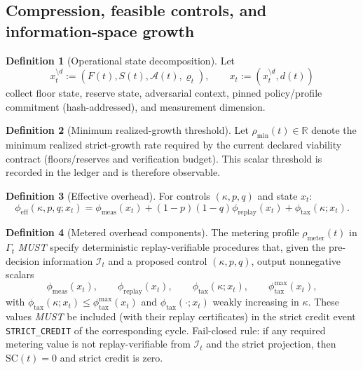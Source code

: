 \documentclass[11pt,a4paper]{article}
\newcommand{\R}{\mathbb{R}}
\newcommand{\cA}{\mathcal{A}}
\newcommand{\cI}{\mathcal{I}}
\theoremstyle{definition}
\newtheorem{definition}{Definition}
\theoremstyle{remark}
\begin{document}
\subsection{Compression, feasible controls, and information-space growth}
\begin{definition}[Operational state decomposition]\label{def:operational_state_decomposition}
Let
\[
x_t^{\setminus d}:=(F(t),S(t),\cA(t),\varrho_t),\qquad
x_t:=(x_t^{\setminus d},d(t))
\]
collect floor state, reserve state, adversarial context, pinned policy/profile commitment (hash-addressed), and measurement dimension.
\end{definition}

\begin{definition}[Minimum realized-growth threshold]\label{def:minimum_realized_growth_threshold}
Let $\rho_{\min}(t)\in\R$ denote the minimum realized strict-growth rate required by the current declared viability contract (floors/reserves and verification budget). This scalar threshold is recorded in the ledger and is therefore observable.
\end{definition}


\begin{definition}[Effective overhead]\label{def:effective_overhead}
For controls $(\kappa,p,q)$ and state $x_t$:
\[
\phi_{\mathrm{eff}}(\kappa,p,q;x_t)=\phi_{\mathrm{meas}}(x_t)+(1-p)(1-q)\phi_{\mathrm{replay}}(x_t)+\phi_{\mathrm{tax}}(\kappa;x_t).
\]
\end{definition}

\begin{definition}[Metered overhead components]\label{def:overhead_components}
The metering profile $\rho_{\mathrm{meter}}(t)$ in $\Gamma_t$ \emph{MUST} specify deterministic replay-verifiable procedures that, given the pre-decision information $\cI_t$ and a proposed control $(\kappa,p,q)$, output nonnegative scalars
\[
\phi_{\mathrm{meas}}(x_t),\qquad \phi_{\mathrm{replay}}(x_t),\qquad \phi_{\mathrm{tax}}(\kappa;x_t),\qquad \phi_{\mathrm{tax}}^{\max}(x_t),
\]
with $\phi_{\mathrm{tax}}(\kappa;x_t)\le \phi_{\mathrm{tax}}^{\max}(x_t)$ and $\phi_{\mathrm{tax}}(\cdot;x_t)$ weakly increasing in $\kappa$.
These values \emph{MUST} be included (with their replay certificates) in the strict credit event \texttt{STRICT\_CREDIT} of the corresponding cycle.
Fail-closed rule: if any required metering value is not replay-verifiable from $\cI_t$ and the strict projection, then $\mathrm{SC}(t)=0$ and strict credit is zero.
\end{definition}
\end{document}
